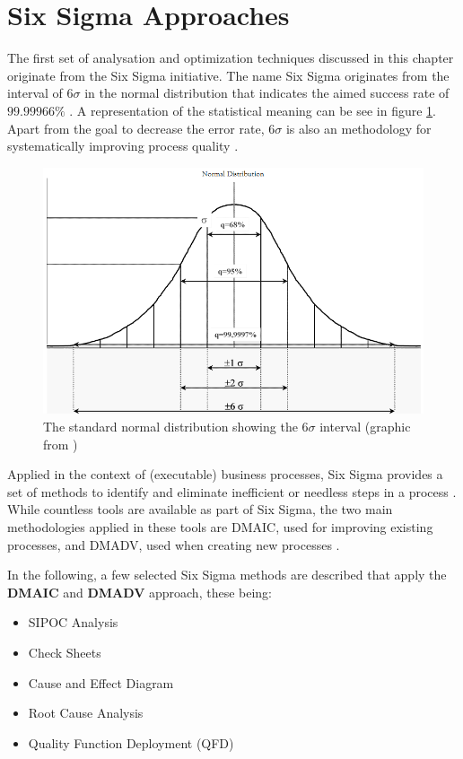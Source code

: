 \section{Six Sigma Approaches}
The first set of analysation and optimization techniques discussed in this chapter originate from the Six Sigma initiative. The name Six Sigma originates from the interval of $6\sigma$ in the normal distribution that indicates the aimed success rate of $99.99966\%$ \cite{siha2008business}\cite{vivekananthamoorthy2011lean} . A representation of the statistical meaning can be see in figure \ref{fig:six-sigma}. Apart from the goal to decrease the error rate, $6\sigma$ is also an methodology for systematically improving process quality \cite{tennant2017six}.

\begin{figure}[H]
		\centering
		\includegraphics[width=0.7\columnwidth]{graphics/six-sigma}
		\caption{The standard normal distribution showing the $6\sigma$ interval (graphic from \cite{vivekananthamoorthy2011lean})} 
		\label{fig:six-sigma} 
\end{figure}

Applied in the context of (executable) business processes, Six Sigma provides a set of methods to identify and eliminate inefficient or needless steps in a process \cite{vom2014handbook}. While countless tools are available as part of Six Sigma, the two main methodologies applied in these tools are \gls{DMAIC}, used for improving existing processes, and \gls{DMADV}, used when creating new processes \cite{selvi2014six} .


In the following, a few selected Six Sigma methods are described that apply the \textbf{DMAIC} and  \textbf{DMADV} approach, these being:  
\begin{itemize}
	\item SIPOC Analysis
	\item Check Sheets
	\item Cause and Effect Diagram
	\item Root Cause Analysis
	\item Quality Function Deployment (QFD)
\end{itemize}

